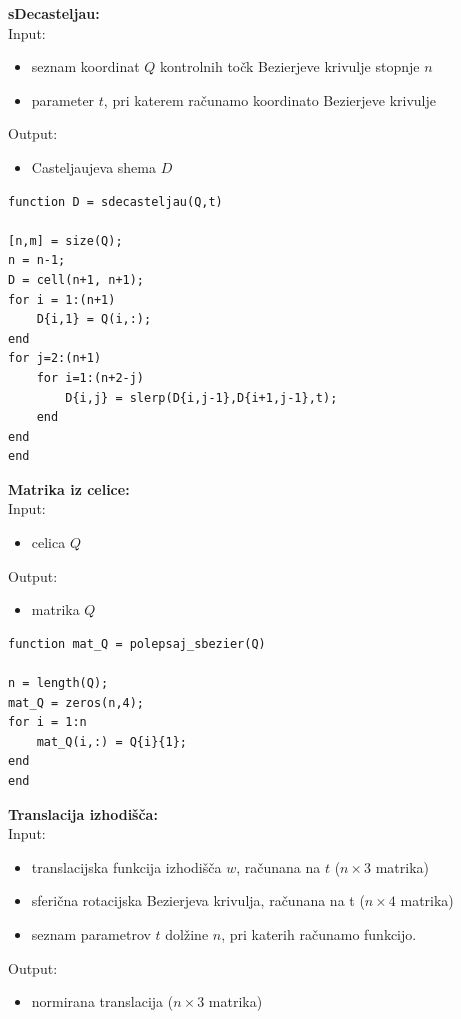 \documentclass[12pt,a4paper,twoside]{article}
\theoremstyle{definition} %
\theoremstyle{plain} %
\numberwithin{equation}{section}  %
\begin{document}
\vspace{0.5cm}
\textbf{sDecasteljau:}\\
Input:
\begin{itemize}
\item seznam koordinat $Q$ kontrolnih točk Bezierjeve krivulje stopnje $n$
\item parameter $t$, pri katerem računamo koordinato Bezierjeve krivulje
\end{itemize}
Output:
\begin{itemize}
\item Casteljaujeva shema $D$
\end{itemize}

\begin{lstlisting}[caption = {sdecasteljau}]
function D = sdecasteljau(Q,t)

[n,m] = size(Q);
n = n-1;
D = cell(n+1, n+1);
for i = 1:(n+1)
    D{i,1} = Q(i,:);
end
for j=2:(n+1)
    for i=1:(n+2-j)
        D{i,j} = slerp(D{i,j-1},D{i+1,j-1},t);
    end
end
end
\end{lstlisting}

\textbf{Matrika iz celice:}\\
Input:
\begin{itemize}
\item celica $Q$
\end{itemize}
Output:
\begin{itemize}
\item matrika $Q$
\end{itemize}

\begin{lstlisting}[caption = {polepsaj\_sbezier}]
function mat_Q = polepsaj_sbezier(Q)

n = length(Q);
mat_Q = zeros(n,4);
for i = 1:n
    mat_Q(i,:) = Q{i}{1};
end
end
\end{lstlisting}

\vspace{1cm}
\textbf{Translacija izhodišča:}\\
Input:
\begin{itemize}
\item translacijska funkcija izhodišča $w$, računana na $t$ ($n \times 3$ matrika)
\item sferična rotacijska Bezierjeva krivulja, računana na t ($n \times 4$ matrika)
\item seznam parametrov $t$ dolžine $n$, pri katerih računamo funkcijo.
\end{itemize}
Output:
\begin{itemize}
\item normirana translacija ($n \times 3$ matrika)
\end{itemize}
\end{document}
